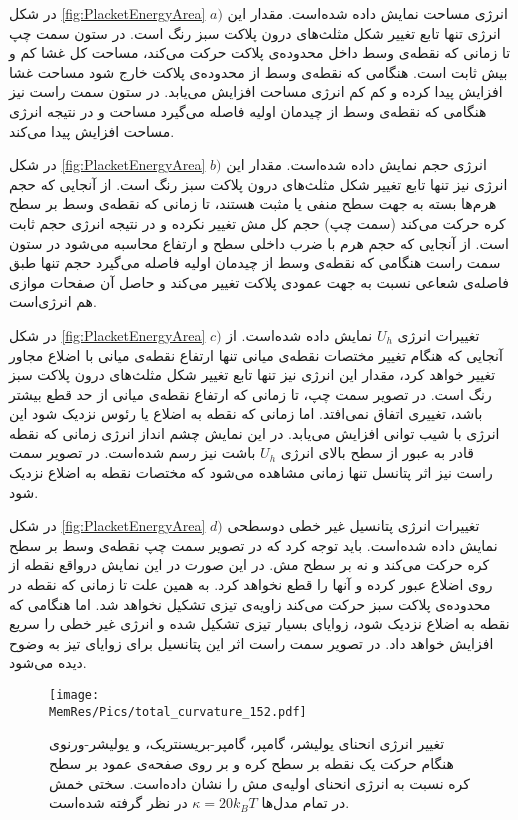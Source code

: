 در شکل 
\ref{fig:PlacketEnergyArea} $a)$
 انرژی مساحت نمایش داده شده‌است. مقدار این انرژی تنها تابع تغییر شکل مثلث‌های درون پلاکت سبز رنگ است. در ستون سمت چپ تا زمانی که نقطه‌ی وسط داخل محدوده‌ی پلاکت حرکت می‌کند، مساحت کل غشا کم و بیش ثابت است. هنگامی‌ که نقطه‌ی وسط از محدوده‌ی پلاکت خارج شود مساحت غشا افزایش پیدا کرده و کم کم انرژی مساحت افزایش می‌یابد. در ستون سمت راست نیز هنگامی که نقطه‌ی وسط از چیدمان اولیه فاصله می‌گیرد مساحت و در نتیجه انرژی مساحت افزایش پیدا می‌کند. 

در شکل 
\ref{fig:PlacketEnergyArea} $b)$
 انرژی حجم نمایش داده شده‌است. مقدار این انرژی نیز تنها تابع تغییر شکل مثلث‌های درون پلاکت سبز رنگ است. از آنجایی که حجم هرم‌ها بسته به جهت سطح منفی یا مثبت هستند، تا زمانی که نقطه‌ی وسط بر سطح کره حرکت می‌کند (سمت چپ) حجم کل مش تغییر نکرده و در نتیجه انرژی حجم ثابت است.‌ از آنجایی که حجم هرم با ضرب داخلی سطح و ارتفاع محاسبه می‌شود در ستون سمت راست  هنگامی که نقطه‌ی وسط از چیدمان اولیه فاصله می‌گیرد حجم تنها طبق فاصله‌ی شعاعی نسبت به جهت عمودی پلاکت تغییر می‌کند و حاصل آن صفحات موازی هم انرژی‌است.

در شکل 
\ref{fig:PlacketEnergyArea} $c)$
تغییرات انرژی 
$U_h$
 نمایش داده شده‌است. از آنجایی که هنگام تغییر مختصات نقطه‌ی میانی تنها ارتفاع نقطه‌ی میانی با اضلاع مجاور تغییر خواهد کرد، مقدار این انرژی نیز تنها تابع تغییر شکل مثلث‌های درون پلاکت سبز رنگ است. در تصویر سمت چپ، تا زمانی که ارتفاع نقطه‌ی میانی از حد قطع بیشتر باشد، تغییری اتفاق نمی‌افتد. اما زمانی که نقطه به اضلاع یا رئوس نزدیک شود این انرژی با شیب توانی افزایش می‌یابد. در این نمایش چشم انداز انرژی زمانی که نقطه قادر به عبور از سطح بالای انرژی 
 $U_h$
 باشت نیز رسم شده‌است. در تصویر سمت راست نیز اثر پتانسل تنها زمانی مشاهده می‌شود که مختصات نقطه به اضلاع نزدیک شود.
 
 در شکل 
\ref{fig:PlacketEnergyArea} $d)$
تغییرات انرژی پتانسیل غیر خطی دوسطحی نمایش داده شده‌است. باید توجه کرد که در تصویر سمت چپ نقطه‌ی وسط بر سطح کره حرکت می‌کند و نه بر سطح مش. در این صورت در این نمایش درواقع نقطه از روی اضلاع عبور کرده و آنها را قطع نخواهد کرد. به همین علت تا زمانی که نقطه در محدوده‌ی پلاکت سبز حرکت می‌کند زاویه‌ی تیزی تشکیل نخواهد شد. اما هنگامی که نقطه به اضلاع نزدیک شود، زوایای بسیار تیزی تشکیل شده و انرژی غیر خطی را سریع افزایش خواهد داد. در تصویر سمت راست اثر این پتانسیل برای زوایای تیز به وضوح دیده می‌شود.


\begin{figure}[htbp]
\begin{center}
\texttt{[image: \\MemRes/Pics/total\_curvature\_152.pdf]}
\caption{
تغییر انرژی انحنای یولیشر، گامپر، گامپر-بریسنتریک، و یولیشر-ورنوی هنگام حرکت یک نقطه بر سطح کره و بر روی صفحه‌ی عمود بر سطح کره نسبت به انرژی انحنای اولیه‌ی مش را نشان داده‌است. سختی خمش در تمام مدل‌ها 
$\kappa=20k_BT$
در نظر گرفته شده‌است.
}
\label{fig:PlacketEnergy}
\end{center}
\end{figure}



